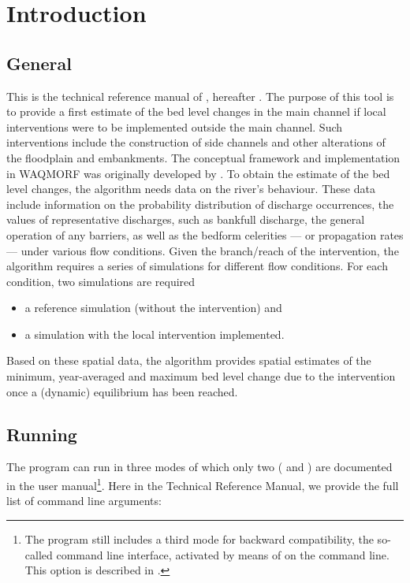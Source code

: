\chapter{Introduction}

\section{General}

This is the technical reference manual of \dfastmi, hereafter \dfmi.
The purpose of this tool is to provide a first estimate of the bed level changes in the main channel if local interventions were to be implemented outside the main channel.
Such interventions include the construction of side channels and other alterations of the floodplain and embankments.
The conceptual framework and implementation in WAQMORF was originally developed by \citep{Sieben2008}.
To obtain the estimate of the bed level changes, the algorithm needs data on the river's behaviour.
These data include information on the probability distribution of discharge occurrences, the values of representative discharges, such as bankfull discharge, the general operation of any barriers, as well as the bedform celerities --- or propagation rates --- under various flow conditions.
Given the branch/reach of the intervention, the algorithm requires a series of \dflowfm simulations for different flow conditions.
For each condition, two simulations are required

\begin{itemize}
\item a reference simulation (without the intervention) and
\item a simulation with the local intervention implemented.
\end{itemize}

Based on these spatial data, the algorithm provides spatial estimates of the minimum, year-averaged and maximum bed level change due to the intervention once a (dynamic) equilibrium has been reached.

\section{Running \dfmi}

The program can run in three modes of which only two ( and ) are documented in the user manual\footnote{\label{fn:backward1}The program still includes a third mode for backward compatibility, the so-called command line interface, activated by means of  on the command line.
This option is described in .}.
Here in the Technical Reference Manual, we provide the full list of command line arguments:

